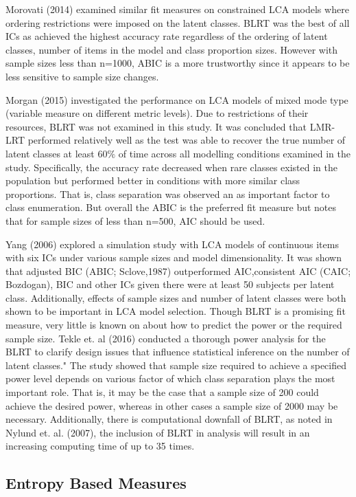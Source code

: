 Morovati (2014) examined similar fit measures on constrained LCA models where ordering restrictions were imposed on the latent classes. BLRT was the best of all ICs as achieved the highest accuracy rate regardless of the ordering of latent classes, number of items in the model and class proportion sizes. However with sample sizes less than n=1000, ABIC is a more trustworthy since it appears to be less sensitive to sample size changes. 

Morgan (2015) investigated the performance on LCA models of mixed mode type (variable measure on different metric levels). Due to restrictions of their resources, BLRT was not examined in this study. It was concluded that LMR-LRT performed relatively well as the test was able to recover the true number of latent classes at least $60\%$ of time across all modelling conditions examined in the study. Specifically, the accuracy rate decreased when rare classes existed in the population but performed better in conditions with more similar class proportions. That is, class separation was observed an as important factor to class enumeration. But overall the ABIC is the preferred fit measure but notes that for sample sizes of less than n=500, AIC should be used. 

Yang (2006) explored a simulation study with LCA models of continuous items with six ICs under various sample sizes and model dimensionality. It was shown that adjusted BIC (ABIC; Sclove,1987) outperformed AIC,consistent AIC (CAIC; Bozdogan), BIC and other ICs given there were at least 50 subjects per latent class. Additionally, effects of sample sizes and number of latent classes were both shown to be important in LCA model selection. Though BLRT is a promising fit measure, very little is known on about how to predict the power or the required sample size. Tekle et. al (2016) conducted a thorough power analysis for the BLRT to clarify design issues that influence statistical inference on the number of latent classes." The study showed that sample size required to achieve a specified power level depends on various factor of which class separation plays the most important role. That is, it may be the case that a sample size of 200 could achieve the desired power, whereas in other cases a sample size of 2000 may be necessary. Additionally, there is computational downfall of BLRT, as noted in Nylund et. al. (2007), the inclusion of BLRT in analysis will result in an increasing computing time of up to 35 times. 

\subsection{Entropy Based Measures}

